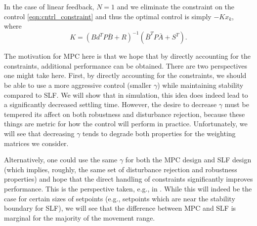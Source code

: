 \documentclass[journal,twocolumn,twoside]{IEEEtran}
\newcommand{\Ad}{\ensuremath{\bar A }\xspace}
\newcommand{\Bd}{\ensuremath{\bar B }\xspace}
\begin{document}
In the case of linear feedback, $N=1$ and we eliminate the constraint on the control \eqref{eqn:cntrl_constraint} and thus the optimal control is simply $-Kx_k$, where
\begin{equation}
  K = (Bd^TP\Bd + R)^{-1}(\Bd^TP\Ad + S^T).
\end{equation}

The motivation for MPC here is that we hope that by directly accounting for the constraints, additional performance can be obtained. There are two perspectives one might take here. First, by directly accounting for the constraints, we should be able to use a more aggressive control (smaller $\gamma$) while maintaining stability compared to SLF.
We will show that in simulation, this idea does indeed lead to a significantly decreased settling time. However, the desire to decrease $\gamma$ must be tempered its affect on both robustness and disturbance rejection, because these things are metric for how the control will perform in practice. Unfortunately, we will see that decreasing $\gamma$ tends to degrade both properties for the weighting matrices we consider. 

Alternatively, one could use the same $\gamma$ for both the MPC design and SLF design (which implies, roughly,  the same set of disturbance rejection and robustness properties) and hope that the direct handling of constraints significantly improves performance. This is the perspective taken, e.g., in \cite{Wills_CDC_2005}. While this will indeed be the case for certain sizes of setpoints (e.g., setpoints which are near the stability boundary for SLF), we will see that the difference between MPC and SLF is marginal for the majority of the movement range.

\end{document}
